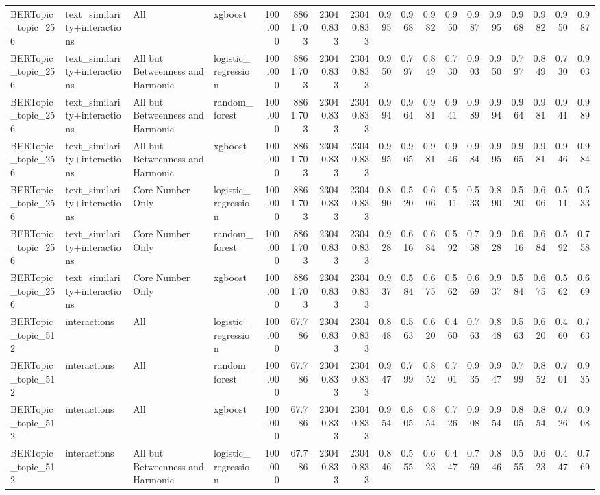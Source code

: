 \begin{tabular}{llllrrrrrrrrrrrrrr}
BERTopic\_topic\_256 & text\_similarity+interactions & All & xgboost & 100.000 & 8861.703 & 23040.833 & 23040.833 & 0.995 & 0.968 & 0.982 & 0.950 & 0.987 & 0.995 & 0.968 & 0.982 & 0.950 & 0.987 \\
BERTopic\_topic\_256 & text\_similarity+interactions & All but Betweenness and Harmonic & logistic\_regression & 100.000 & 8861.703 & 23040.833 & 23040.833 & 0.950 & 0.797 & 0.849 & 0.730 & 0.903 & 0.950 & 0.797 & 0.849 & 0.730 & 0.903 \\
BERTopic\_topic\_256 & text\_similarity+interactions & All but Betweenness and Harmonic & random\_forest & 100.000 & 8861.703 & 23040.833 & 23040.833 & 0.994 & 0.964 & 0.981 & 0.941 & 0.989 & 0.994 & 0.964 & 0.981 & 0.941 & 0.989 \\
BERTopic\_topic\_256 & text\_similarity+interactions & All but Betweenness and Harmonic & xgboost & 100.000 & 8861.703 & 23040.833 & 23040.833 & 0.995 & 0.965 & 0.981 & 0.946 & 0.984 & 0.995 & 0.965 & 0.981 & 0.946 & 0.984 \\
BERTopic\_topic\_256 & text\_similarity+interactions & Core Number Only & logistic\_regression & 100.000 & 8861.703 & 23040.833 & 23040.833 & 0.890 & 0.520 & 0.606 & 0.511 & 0.533 & 0.890 & 0.520 & 0.606 & 0.511 & 0.533 \\
BERTopic\_topic\_256 & text\_similarity+interactions & Core Number Only & random\_forest & 100.000 & 8861.703 & 23040.833 & 23040.833 & 0.928 & 0.616 & 0.684 & 0.592 & 0.758 & 0.928 & 0.616 & 0.684 & 0.592 & 0.758 \\
BERTopic\_topic\_256 & text\_similarity+interactions & Core Number Only & xgboost & 100.000 & 8861.703 & 23040.833 & 23040.833 & 0.937 & 0.584 & 0.675 & 0.562 & 0.669 & 0.937 & 0.584 & 0.675 & 0.562 & 0.669 \\
BERTopic\_topic\_512 & interactions & All & logistic\_regression & 100.000 & 67.786 & 23040.833 & 23040.833 & 0.848 & 0.563 & 0.620 & 0.460 & 0.763 & 0.848 & 0.563 & 0.620 & 0.460 & 0.763 \\
BERTopic\_topic\_512 & interactions & All & random\_forest & 100.000 & 67.786 & 23040.833 & 23040.833 & 0.947 & 0.799 & 0.852 & 0.701 & 0.935 & 0.947 & 0.799 & 0.852 & 0.701 & 0.935 \\
BERTopic\_topic\_512 & interactions & All & xgboost & 100.000 & 67.786 & 23040.833 & 23040.833 & 0.954 & 0.805 & 0.854 & 0.726 & 0.908 & 0.954 & 0.805 & 0.854 & 0.726 & 0.908 \\
BERTopic\_topic\_512 & interactions & All but Betweenness and Harmonic & logistic\_regression & 100.000 & 67.786 & 23040.833 & 23040.833 & 0.846 & 0.555 & 0.623 & 0.447 & 0.769 & 0.846 & 0.555 & 0.623 & 0.447 & 0.769 \\

\end{tabular}
